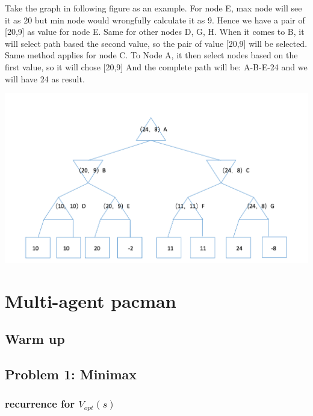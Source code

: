 \documentclass[12pt]{article}
\begin{document}
Take the graph in following figure as an example. 
For node E, max node will see it as 20 but min node would wrongfully calculate it as 9. Hence we have a pair of [20,9]
as value for node E. Same for other nodes D, G, H. When it comes to B, it will select path based the second value, so the pair of value [20,9] will 
be selected. Same method applies for node C. To Node A, it then select nodes based on the first value, so it will chose [20,9] And the complete path will
be: A-B-E-24 and we will have 24 as result.	
         		 \begin{center}
                        \includegraphics[scale=0.6]{p2.png}
                        \end{center}		


























\section{Multi-agent pacman}
\subsection{Warm up}
\subsection{Problem 1: Minimax}
\subsubsection{recurrence for $V_{opt}(s)$}
\end{document}
